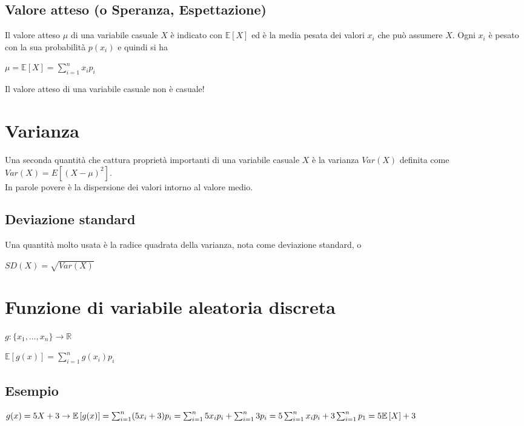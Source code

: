 \documentclass[12pt]{article}
\begin{document}
\subsection{Valore atteso (o Speranza, Espettazione)}
Il valore atteso $\mu$ di una variabile casuale $X$ è indicato con $\mathbb{E}\left[X\right]$ ed è la media pesata dei valori $x_{i}$ che può assumere $X$. Ogni $x_{i}$ è pesato con la sua probabilità $p(x_{i})$ e quindi si ha
\begin{center}
    \(\mu=\mathbb{E}\left[X\right]=\sum_{i=1}^{n}x_{i}p_{i}\)
\end{center}
Il valore atteso di una variabile casuale non è casuale!
\section{Varianza}
Una seconda quantità che cattura proprietà importanti di una variabile casuale $X$ è la varianza $Var(X)$ definita come $Var(X)=E\left[(X-\mu)^{2}\right]$.\\
In parole povere è la dispersione dei valori intorno al valore medio.
\subsection{Deviazione standard}
Una quantità molto usata è la radice quadrata della varianza, nota come deviazione standard, o
\begin{center}
    \(SD(X)=\sqrt{Var(X)}\)
\end{center}
\section{Funzione di variabile aleatoria discreta}
$g:\{x_{1},\dots,x_{n}\} \rightarrow \mathbb{R}$
\begin{center}
    \(\mathbb{E}\left[g(x)\right]=\sum_{i=1}^{n}g(x_{i})p_{i}\)
\end{center}
\subsection{Esempio}
\(g(x)=5X+3 \rightarrow\\ \mathbb{E}\left[g(x)\right]=\sum_{i=1}^{n}(5x_{i}+3)p_{i}=\sum_{i=1}^{n}5x_{i}p_{i}+\sum_{i=1}^{n}3p_{i}=5\sum_{i=1}^{n}x_{i}p_{i}+3\sum_{i=1}^{n}p_{1}=5\mathbb{E}\left[X\right]+3\)
\end{document}
